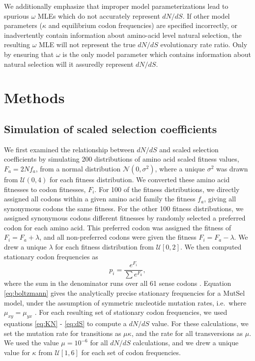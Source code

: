 \documentclass{pnastwo}
\begin{document}
\begin{article}
We additionally emphasize that improper model parameterizations lead to spurious $\omega$ MLEs which do not accurately represent $dN/dS$. If other model parameters ($\kappa$ and equilibrium codon frequencies) are specified incorrectly, or inadvertently contain information about amino-acid level natural selection, the resulting $\omega$ MLE will not represent the true $dN/dS$ evolutionary rate ratio. Only by ensuring that $\omega$ is the only model parameter which contains information about natural selection will it assuredly represent $dN/dS$. 
		
		
\section*{Methods}

\subsection*{Simulation of scaled selection coefficients}

We first examined the relationship between $dN/dS$ and scaled selection coefficients by simulating 200 distributions of amino acid scaled fitness values, $F_a = 2Nf_a$, from a normal distribution $\mathcal{N}(0,\sigma^2)$, where a unique $\sigma^2$ was drawn from $\mathcal{U}(0,4)$ for each fitness distribution. We converted these amino acid fitnesses to codon fitnesses, $F_i$. For 100 of the fitness distributions, we directly assigned all codons within a given amino acid family the fitness $f_a$, giving all synonymous codons the same fitness. For the other 100 fitness distributions, we assigned synonymous codons different fitnesses by randomly selected a preferred codon for each amino acid. This preferred codon was assigned the fitness of $F_i = F_a + \lambda$, and all non-preferred codons were given the fitness $F_i = F_a - \lambda$. We drew a unique $\lambda$ for each fitness distribution from $\mathcal{U}[0,2]$. 
We then computed stationary codon frequencies as 
\begin{equation}\label{eq:boltzmann}
p_i = \frac{e^{F_i}}{\sum e^{F_k}}, 
\end{equation} where the sum in the denominator runs over all 61 sense codons \cite{SellaHirsh2005}. Equation \eqref{eq:boltzmann} gives the analytically precise stationary frequencies for a MutSel model, under the assumption of symmetric nucleotide mutation rates, i.e.\ where $\mu_{xy} = \mu_{yx}$ \cite{SellaHirsh2005}. For each resulting set of stationary codon frequencies, we used equations \eqref{eq:KN} - \eqref{eq:dS} to compute a $dN/dS$ value. For these calculations, we set the mutation rate for transitions as $\mu\kappa$, and the rate for all transversions as $\mu$. We used the value $\mu = 10^{-6}$ for all $dN/dS$ calculations, and we drew a unique value for $\kappa$ from $\mathcal{U}[1,6]$ for each set of codon frequencies.



\end{article}
\end{document}
